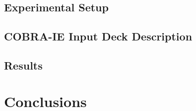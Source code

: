 \section{}
\subsection{Experimental Setup}
\subsection{COBRA-IE Input Deck Description}
\subsection{Results}

\section{Conclusions}



